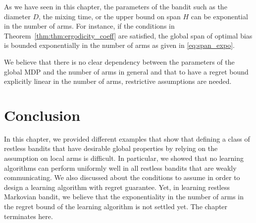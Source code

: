 As we have seen in this chapter, the parameters of the bandit such as the diameter $D$, the mixing time, or the upper bound on span $H$ can be exponential in the number of arms.
For instance, if the conditions in Theorem~\ref{thm:thm:ergodicity_coeff} are satisfied, the global span of optimal bias is bounded exponentially in the number of arms as given in \eqref{eq:span_expo}.

We believe that there is no clear dependency between the parameters of the global MDP and the number of arms in general and that to have a regret bound explicitly linear in the number of arms, restrictive assumptions are needed.

\section{Conclusion}
\label{ch:restless:sec:conclude}

In this chapter, we provided different examples that show that defining a class of restless bandits that have desirable global properties by relying on the assumption on local arms is difficult.
In particular, we showed that no learning algorithms can perform uniformly well in all restless bandits that are weakly communicating.
We also discussed about the conditions to assume in order to design a learning algorithm with regret guarantee.
Yet, in learning restless Markovian bandit, we believe that the exponentiality in the number of arms in the regret bound of the learning algorithm is not settled yet.
The chapter terminates here.

\endgroup
